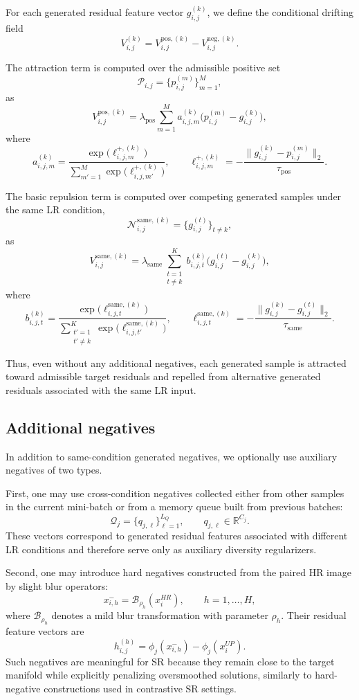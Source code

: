 \documentclass{article}
\begin{document}
For each generated residual feature vector \(g_{i,j}^{(k)}\), we define the conditional drifting field
\[
V_{i,j}^{(k)}
=
V_{i,j}^{\mathrm{pos},(k)}
-
V_{i,j}^{\mathrm{neg},(k)}.
\]

The attraction term is computed over the admissible positive set
\[
\mathcal{P}_{i,j}=\{p_{i,j}^{(m)}\}_{m=1}^{M},
\]
as
\[
V_{i,j}^{\mathrm{pos},(k)}
=
\lambda_{\mathrm{pos}}
\sum_{m=1}^{M}
a_{i,j,m}^{(k)}
\bigl(
p_{i,j}^{(m)}-g_{i,j}^{(k)}
\bigr),
\]
where
\[
a_{i,j,m}^{(k)}
=
\frac{\exp\!\bigl(\ell_{i,j,m}^{+,(k)}\bigr)}
{\sum\limits_{m'=1}^{M}\exp\!\bigl(\ell_{i,j,m'}^{+,(k)}\bigr)},
\qquad
\ell_{i,j,m}^{+,(k)}
=
-\frac{\|g_{i,j}^{(k)}-p_{i,j}^{(m)}\|_2}{\tau_{\mathrm{pos}}}.
\]

The basic repulsion term is computed over competing generated samples under the same LR condition,
\[
\mathcal{N}_{i,j}^{\mathrm{same},(k)}
=
\{g_{i,j}^{(t)}\}_{t\neq k},
\]
as
\[
V_{i,j}^{\mathrm{same},(k)}
=
\lambda_{\mathrm{same}}
\sum_{\substack{t=1\\ t\neq k}}^{K}
b_{i,j,t}^{(k)}
\bigl(
g_{i,j}^{(t)}-g_{i,j}^{(k)}
\bigr),
\]
where
\[
b_{i,j,t}^{(k)}
=
\frac{\exp\!\bigl(\ell_{i,j,t}^{\mathrm{same},(k)}\bigr)}
{\sum\limits_{\substack{t'=1\\ t'\neq k}}^{K}\exp\!\bigl(\ell_{i,j,t'}^{\mathrm{same},(k)}\bigr)},
\qquad
\ell_{i,j,t}^{\mathrm{same},(k)}
=
-\frac{\|g_{i,j}^{(k)}-g_{i,j}^{(t)}\|_2}{\tau_{\mathrm{same}}}.
\]

Thus, even without any additional negatives, each generated sample is attracted toward admissible target residuals and repelled from alternative generated residuals associated with the same LR input.

\subsection{Additional negatives}

In addition to same-condition generated negatives, we optionally use auxiliary negatives of two types.

First, one may use cross-condition negatives collected either from other samples in the current mini-batch or from a memory queue built from previous batches:
\[
\mathcal{Q}_j=\{q_{j,\ell}\}_{\ell=1}^{L_Q},
\qquad
q_{j,\ell}\in\mathbb{R}^{C_j}.
\]
These vectors correspond to generated residual features associated with different LR conditions and therefore serve only as auxiliary diversity regularizers.

Second, one may introduce hard negatives constructed from the paired HR image by slight blur operators:
\[
x_{i,h}^{-}=\mathcal{B}_{\rho_h}(x_i^{HR}),
\qquad
h=1,\dots,H,
\]
where \(\mathcal{B}_{\rho_h}\) denotes a mild blur transformation with parameter \(\rho_h\). Their residual feature vectors are
\[
h_{i,j}^{(h)}=\phi_j(x_{i,h}^{-})-\phi_j(x_i^{UP}).
\]
Such negatives are meaningful for SR because they remain close to the target manifold while explicitly penalizing oversmoothed solutions, similarly to hard-negative constructions used in contrastive SR settings. 
\end{document}
